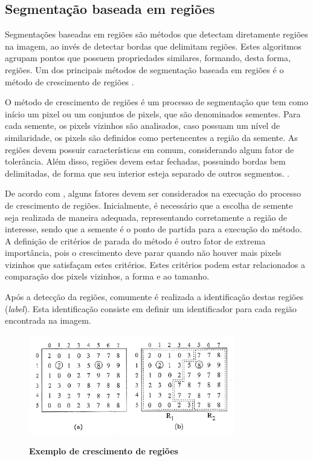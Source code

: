 \documentclass[
	12pt,				%
	oneside,			%
	a4paper,			%
	english,			%
	french,				%
	spanish,			%
	brazil,				%
	]{abntex2}
\begin{document}
\subsection{Segmentação baseada em regiões}     

Segmentações baseadas em regiões são métodos que detectam diretamente regiões na imagem, ao invés de detectar bordas que delimitam regiões. Estes algoritmos agrupam pontos que possuem propriedades similares, formando, desta forma, regiões. Um dos principais métodos de segmentação baseada em regiões é o método de crescimento de regiões \cite{pedriniSchwartz:2008}.

O método de crescimento de regiões é um processo de segmentação que tem como início um pixel ou um conjuntos de pixels, que são denominados sementes. Para cada semente, os pixels vizinhos são analisados, caso possuam um nível de similaridade, os pixels são definidos como pertencentes a região da semente. As regiões devem possuir características em comum, considerando algum fator de tolerância. Além disso, regiões devem estar fechadas, possuindo bordas bem delimitadas, de forma que seu interior esteja separado de outros segmentos. \cite{conciAzevedoLeta:2008}.

De acordo com \citet{conciAzevedoLeta:2008}, alguns fatores devem ser considerados na execução do processo de crescimento de regiões. Inicialmente, é necessário que a escolha de semente seja realizada de maneira adequada, representando corretamente a região de interesse, sendo que a semente é o ponto de partida para a execução do método. A definição de critérios de parada do método é outro fator de extrema importância, pois o crescimento deve parar quando não houver mais pixels vizinhos que satisfaçam estes critérios. Estes critérios podem estar relacionados a comparação dos pixels vizinhos, a forma e ao tamanho.

Após a detecção da regiões, comumente é realizada a identificação destas regiões (\textit{label}). Esta identificação consiste em definir um identificador para cada região encontrada na imagem. 

\begin{figure}[ht]
\centering
\caption{\textbf{Exemplo de crescimento de regiões}}
\includegraphics[width=0.8\textwidth]{imagens/crescimento_regiao.png}
\label{fig:crescimento_regiao}
\end{figure}
\end{document}
